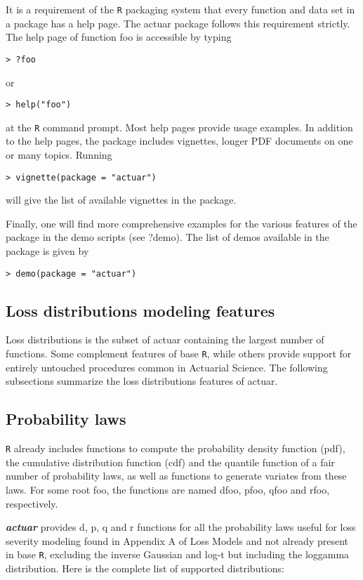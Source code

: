 \documentclass[12pt]{article}
\begin{document}
It is a requirement of the \texttt{R} packaging system that every function and data set in a package has a help page. The actuar package follows this requirement strictly. The help page of function foo is accessible by typing


\begin{verbatim}
> ?foo
\end{verbatim}
or
\begin{verbatim}
> help("foo")
\end{verbatim}


at the \texttt{R} command prompt. Most help pages provide usage examples. In addition to the help pages, the package includes vignettes, longer PDF documents on one or many topics. Running 
\begin{verbatim}
> vignette(package = "actuar")
\end{verbatim}
will give the list of available vignettes in the package.

Finally, one will find more comprehensive examples for the various features of the package in the demo scripts (see ?demo). The list of demos available in the package is given by

\begin{verbatim}
> demo(package = "actuar")
\end{verbatim}


\subsection{Loss distributions modeling features}

Loss distributions is the subset of actuar containing the largest number of functions. Some complement features of base \texttt{R}, while others provide support for entirely untouched procedures common in Actuarial Science. The following subsections summarize the loss distributions features of actuar. 

\subsection{Probability laws}

\texttt{R} already includes functions to compute the probability density function (pdf), the cumulative distribution function (cdf) and the quantile function of a fair number of probability laws, as well as functions to generate variates from these laws. For some root foo, the functions are named dfoo, pfoo, qfoo and rfoo, respectively.

\textbf{\textit{actuar}} provides d, p, q and r functions for all the probability laws useful for loss severity modeling found in Appendix A of Loss Models and not already present in base \texttt{R}, excluding the inverse Gaussian and log-t but including the loggamma distribution. Here is the complete list of supported distributions:
\end{document}
